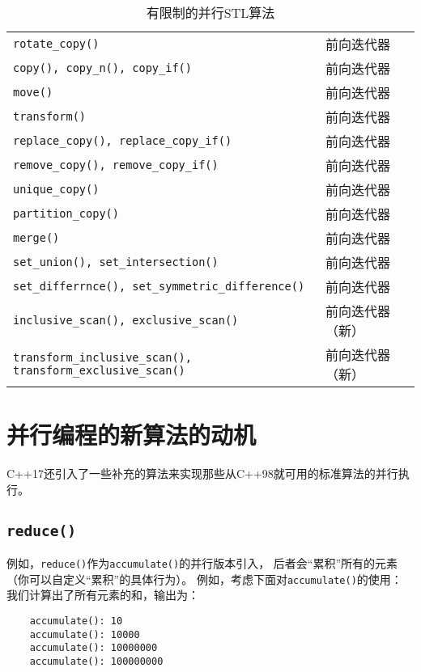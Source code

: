 \begin{table}[htb]
\begin{tabular}{l|l}
        \texttt{rotate\_copy()}                                             & 前向迭代器                   \\
        \texttt{copy(), copy\_n(), copy\_if()}                              & 前向迭代器                   \\
        \texttt{move()}                                                     & 前向迭代器                   \\
        \texttt{transform()}                                                & 前向迭代器                   \\
        \texttt{replace\_copy(), replace\_copy\_if()}                       & 前向迭代器                   \\
        \texttt{remove\_copy(), remove\_copy\_if()}                         & 前向迭代器                   \\
        \texttt{unique\_copy()}                                             & 前向迭代器                   \\
        \texttt{partition\_copy()}                                          & 前向迭代器                   \\
        \texttt{merge()}                                                    & 前向迭代器                   \\
        \texttt{set\_union(), set\_intersection()}                          & 前向迭代器                   \\
        \texttt{set\_differrnce(), set\_symmetric\_difference()}            & 前向迭代器                   \\
        \texttt{inclusive\_scan(), exclusive\_scan()}                       & 前向迭代器（新）                \\
        \texttt{transform\_inclusive\_scan(), transform\_exclusive\_scan()} & 前向迭代器（新）                \\
        \hline
    \end{tabular}
    \caption{有限制的并行STL算法}
    \label{t22.4}
\end{table}


\section{并行编程的新算法的动机}\label{ch22.6}
C++17还引入了一些补充的算法来实现那些从C++98就可用的标准算法的并行执行。

\subsection{\texttt{reduce()}}\label{ch22.6.1}
例如，\texttt{reduce()}作为\texttt{accumulate()}的并行版本引入，
后者会“累积”所有的元素（你可以自定义“累积”的具体行为）。
例如，考虑下面对\texttt{accumulate()}的使用：
我们计算出了所有元素的和，输出为：
\begin{lstlisting}
    accumulate(): 10
    accumulate(): 10000
    accumulate(): 10000000
    accumulate(): 100000000
\end{lstlisting}

